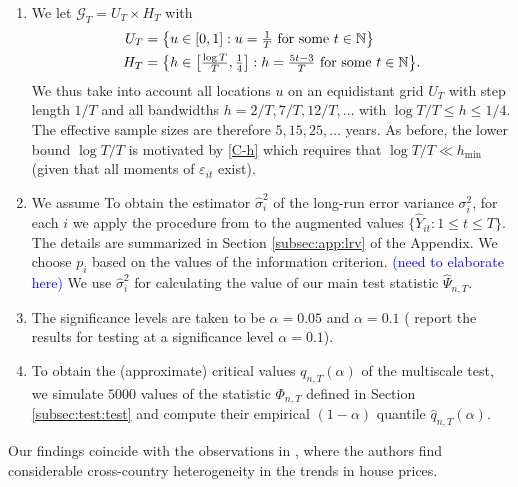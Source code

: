 \documentclass[a4paper,12pt]{article}
\begin{document}
\begin{enumerate}
\item We let $\mathcal{G}_T = U_T \times H_T$ with 
\begin{align*}
U_T & = \big\{ u \in [0,1]: u = \textstyle{\frac{1}{T}} \text{ for some } t \in \mathbb{N} \big\} \\
H_T & = \big\{ h \in \big[ \textstyle{\frac{\log T}{T}}, \textstyle{\frac{1}{4}} \big]:  h = \textstyle{\frac{5t - 3}{T}} \text{ for some } t \in \mathbb{N} \big\}. 
\end{align*}
We thus take into account all locations $u$ on an equidistant grid $U_T$ with step length $1/T$ and all bandwidths $h=2/T, 7/T, 12/T,\ldots$ with $\log T /T \le h \le 1/4$. The effective sample sizes are therefore $5, 15, 25, \ldots$ years. As before, the lower bound $\log T / T$ is motivated by \ref{C-h} which requires that $\log T /T \ll h_{\min}$ (given that all moments of $\varepsilon_{it}$ exist).
\item We assume 
To obtain the estimator $\hat{\sigma}_i^2$ of the long-run error variance $\sigma^2_i$, for each $i$ we apply the procedure from \cite{KhismatullinaVogt2020} to the augmented values \linebreak $\{\widehat{Y}_{it}: 1\leq t \leq T\}$. The details are summarized in Section \ref{subsec:app:lrv} of the Appendix. %
We choose $p_i$ based on the values of the information criterion. \textcolor{blue}{(need to elaborate here)} We use $\hat{\sigma}^2_i$ for calculating the value of our main test statistic $\widehat{\Psi}_{n, T}$. %
\item The significance levels are taken to be $\alpha = 0.05$ and $\alpha = 0.1$ (\citet{Zhang2012} report the results for testing at a significance level $\alpha = 0.1$).
\item To obtain the (approximate) critical values $q_{n, T}(\alpha)$ of the multiscale test, we simulate $5000$ values of the statistic $\Phi_{n, T}$ defined in Section \ref{subsec:test:test} and compute their empirical $(1-\alpha)$ quantile $\hat{q}_{n, T}(\alpha)$.
\end{enumerate}

Our findings coincide with the observations in \cite{Knoll2017}, where the authors find considerable cross-country heterogeneity in the trends in house prices.
\end{document}
